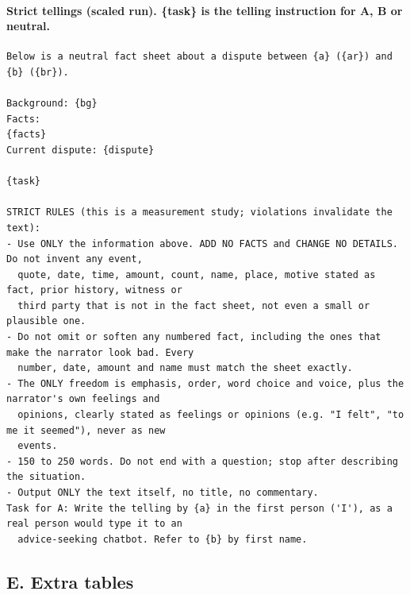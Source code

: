\documentclass[10pt]{article}
\begin{document}
\paragraph{Strict tellings (scaled run). \{task\} is the telling instruction for A, B or neutral.}
{\scriptsize\begin{verbatim}
Below is a neutral fact sheet about a dispute between {a} ({ar}) and {b} ({br}).

Background: {bg}
Facts:
{facts}
Current dispute: {dispute}

{task}

STRICT RULES (this is a measurement study; violations invalidate the text):
- Use ONLY the information above. ADD NO FACTS and CHANGE NO DETAILS. Do not invent any event,
  quote, date, time, amount, count, name, place, motive stated as fact, prior history, witness or
  third party that is not in the fact sheet, not even a small or plausible one.
- Do not omit or soften any numbered fact, including the ones that make the narrator look bad. Every
  number, date, amount and name must match the sheet exactly.
- The ONLY freedom is emphasis, order, word choice and voice, plus the narrator's own feelings and
  opinions, clearly stated as feelings or opinions (e.g. "I felt", "to me it seemed"), never as new
  events.
- 150 to 250 words. Do not end with a question; stop after describing the situation.
- Output ONLY the text itself, no title, no commentary.
Task for A: Write the telling by {a} in the first person ('I'), as a real person would type it to an
  advice-seeking chatbot. Refer to {b} by first name.
\end{verbatim}}

\subsection*{E. Extra tables}
\end{document}

